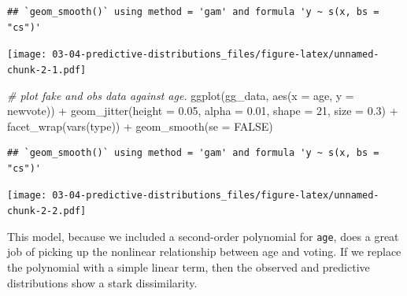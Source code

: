\documentclass[
]{book}
\newenvironment{Shaded}{\begin{snugshade}}{\end{snugshade}}
\newcommand{\AttributeTok}[1]{\textcolor[rgb]{0.77,0.63,0.00}{#1}}
\newcommand{\CommentTok}[1]{\textcolor[rgb]{0.56,0.35,0.01}{\textit{#1}}}
\newcommand{\ConstantTok}[1]{\textcolor[rgb]{0.00,0.00,0.00}{#1}}
\newcommand{\DecValTok}[1]{\textcolor[rgb]{0.00,0.00,0.81}{#1}}
\newcommand{\FloatTok}[1]{\textcolor[rgb]{0.00,0.00,0.81}{#1}}
\newcommand{\FunctionTok}[1]{\textcolor[rgb]{0.00,0.00,0.00}{#1}}
\newcommand{\NormalTok}[1]{#1}
\newcommand{\SpecialCharTok}[1]{\textcolor[rgb]{0.00,0.00,0.00}{#1}}
\begin{document}
\begin{verbatim}
## `geom_smooth()` using method = 'gam' and formula 'y ~ s(x, bs = "cs")'
\end{verbatim}

\texttt{[image: 03-04-predictive-distributions\_files/figure-latex/unnamed-chunk-2-1.pdf]}

\begin{Shaded}
\begin{Highlighting}[]
\CommentTok{\# plot fake and obs data against age.}
\FunctionTok{ggplot}\NormalTok{(gg\_data, }\FunctionTok{aes}\NormalTok{(}\AttributeTok{x =}\NormalTok{ age, }\AttributeTok{y =}\NormalTok{ newvote)) }\SpecialCharTok{+} 
  \FunctionTok{geom\_jitter}\NormalTok{(}\AttributeTok{height =} \FloatTok{0.05}\NormalTok{, }\AttributeTok{alpha =} \FloatTok{0.01}\NormalTok{, }\AttributeTok{shape =} \DecValTok{21}\NormalTok{, }\AttributeTok{size =} \FloatTok{0.3}\NormalTok{) }\SpecialCharTok{+} 
  \FunctionTok{facet\_wrap}\NormalTok{(}\FunctionTok{vars}\NormalTok{(type)) }\SpecialCharTok{+} 
  \FunctionTok{geom\_smooth}\NormalTok{(}\AttributeTok{se =} \ConstantTok{FALSE}\NormalTok{)}
\end{Highlighting}
\end{Shaded}

\begin{verbatim}
## `geom_smooth()` using method = 'gam' and formula 'y ~ s(x, bs = "cs")'
\end{verbatim}

\texttt{[image: 03-04-predictive-distributions\_files/figure-latex/unnamed-chunk-2-2.pdf]}

This model, because we included a second-order polynomial for \texttt{age}, does a great job of picking up the nonlinear relationship between age and voting. If we replace the polynomial with a simple linear term, then the observed and predictive distributions show a stark dissimilarity.
\end{document}
